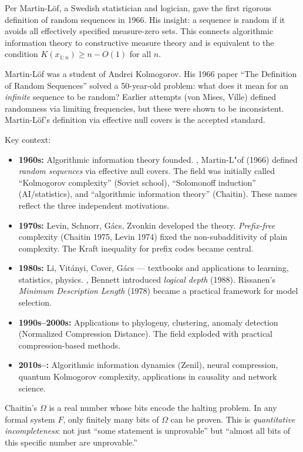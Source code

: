 Per Martin-L\"of, a Swedish statistician and logician, gave the first rigorous definition of random sequences in 1966. His insight: a sequence is random if it avoids all effectively specified measure-zero sets. This connects algorithmic information theory to constructive measure theory and is equivalent to the condition $K(x_{1:n}) \ge n - O(1)$ for all $n$.

Martin-L\"of was a student of Andrei Kolmogorov. His 1966 paper ``The Definition of Random Sequences'' solved a 50-year-old problem: what does it mean for an \emph{infinite} sequence to be random? Earlier attempts (von Mises, Ville) defined randomness via limiting frequencies, but these were shown to be inconsistent. Martin-L\"of's definition via effective null covers is the accepted standard.

Key context:
\begin{itemize}
\item \textbf{1960s:} Algorithmic information theory founded. \cite{martinlof1966}, Martin-L{"o}f (1966) defined \emph{random sequences} via effective null covers. The field was initially called ``Kolmogorov complexity'' (Soviet school), ``Solomonoff induction'' (AI/statistics), and ``algorithmic information theory'' (Chaitin). These names reflect the three independent motivations.
\item \textbf{1970s:} Levin, Schnorr, G\'acs, Zvonkin developed the theory. \emph{Prefix-free} complexity (Chaitin 1975, Levin 1974) fixed the non-subadditivity of plain complexity. The Kraft inequality for prefix codes became central.
\item \textbf{1980s:} Li, Vit\'anyi, Cover, G\'acs --- textbooks and applications to learning, statistics, physics. \cite{bennett1988}, Bennett introduced \emph{logical depth} (1988). Rissanen's \emph{Minimum Description Length} (1978) became a practical framework for model selection.
\item \textbf{1990s--2000s:} Applications to phylogeny, clustering, anomaly detection (Normalized Compression Distance). The field exploded with practical compression-based methods.
\item \textbf{2010s--:} Algorithmic information dynamics (Zenil), neural compression, quantum Kolmogorov complexity, applications in causality and network science.
\end{itemize}

Chaitin's $\Omega$ is a real number whose bits encode the halting problem. In any formal system $F$, only finitely many bits of $\Omega$ can be proven. This is \emph{quantitative incompleteness}: not just ``some statement is unprovable'' but ``almost all bits of this specific number are unprovable.''

